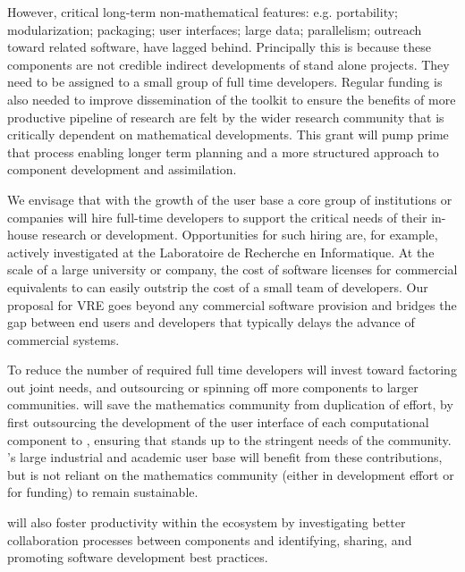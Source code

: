 \documentclass[noworkareas,deliverables,\classoptions]{euproposal}       %
\begin{document}
\begin{proposal}
However, critical long-term non-mathematical features:
e.g. portability; modularization; packaging; user interfaces; large
data; parallelism; outreach toward related software, have lagged
behind. Principally this is because these components are not credible
indirect developments of stand alone projects. They need to be
assigned to a small group of full time developers. Regular funding is
also needed to improve dissemination of the toolkit to ensure the
benefits of more productive pipeline of research are felt by the wider
research community that is critically dependent on mathematical
developments. This grant will pump prime that process enabling longer
term planning and a more structured approach to component development
and assimilation.

We envisage that with the growth of the user base a core group of
institutions or companies will hire full-time developers to support
the critical needs of their in-house research or development.
Opportunities for such hiring are, for example, actively investigated
at the Laboratoire de Recherche en Informatique. At the scale of a
large university or company, the cost of software licenses for
commercial equivalents to \Sage can easily outstrip the cost of a
small team of developers. Our proposal for VRE goes beyond any
commercial software provision and bridges the gap between end users
and developers that typically delays the advance of commercial
systems.


To reduce the number of required full time developers \TheProject will
invest toward factoring out joint needs, and outsourcing or spinning
off more components to larger communities.  \TheProject will save the
mathematics community from duplication of effort, by first outsourcing
the development of the user interface of each computational component
to \Jupyter, ensuring that \Jupyter stands up to the stringent needs
of the community. \Jupyter's large industrial and academic user base
will benefit from these contributions, but is not reliant on the
mathematics community (either in development effort or for funding) to
remain sustainable.

\TheProject will also foster productivity within the ecosystem by
investigating better collaboration processes between components and
identifying, sharing, and promoting software development best
practices.


\end{proposal}
\end{document}
